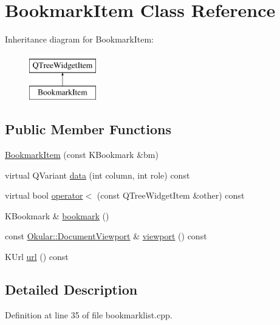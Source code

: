 \hypertarget{classBookmarkItem}{\section{Bookmark\+Item Class Reference}
\label{classBookmarkItem}
}
Inheritance diagram for Bookmark\+Item\+:\begin{figure}[H]
\begin{center}
\leavevmode
\includegraphics[height=2.000000cm]{classBookmarkItem}
\end{center}
\end{figure}
\subsection*{Public Member Functions}
\begin{DoxyCompactItemize}
\item 
\hyperlink{classBookmarkItem_ae1b9c523ae42cf2ed392ae17ec13aea2}{Bookmark\+Item} (const K\+Bookmark \&bm)
\item 
virtual Q\+Variant \hyperlink{classBookmarkItem_ac5552d122e849c6d9ca4a74e36dbb0bc}{data} (int column, int role) const 
\item 
virtual bool \hyperlink{classBookmarkItem_a64dc8aa569e9ec78502ca23741d6af6d}{operator$<$} (const Q\+Tree\+Widget\+Item \&other) const 
\item 
K\+Bookmark \& \hyperlink{classBookmarkItem_a8eb0b1029552031a0fb896ac4efc3405}{bookmark} ()
\item 
const \hyperlink{classOkular_1_1DocumentViewport}{Okular\+::\+Document\+Viewport} \& \hyperlink{classBookmarkItem_a0d026bde6eaadb312ab1b8fb1fd6831b}{viewport} () const 
\item 
K\+Url \hyperlink{classBookmarkItem_ad50510e9314ad2cd4ba0053fff6afaa4}{url} () const 
\end{DoxyCompactItemize}


\subsection{Detailed Description}


Definition at line 35 of file bookmarklist.\+cpp.



